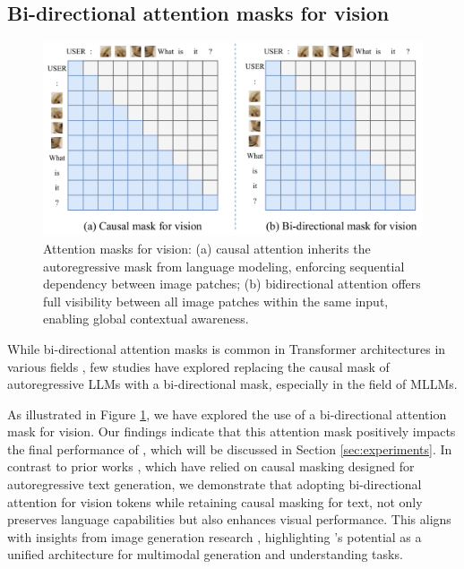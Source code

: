 \subsection{Bi-directional attention masks for vision}

\begin{figure}
    \centering
    \includegraphics[width=\linewidth]{images/Figure3.pdf}
    \caption{Attention masks for vision: (a) causal attention inherits the autoregressive mask from language modeling, enforcing sequential dependency between image patches; (b) bidirectional attention offers full visibility between all image patches within the same input, enabling global contextual awareness.}
    \label{fig:attention-mask}
\end{figure}

While bi-directional attention masks is common in Transformer architectures in various fields \cite{vit, clip, transfusion}, few studies have explored replacing the causal mask of autoregressive LLMs with a bi-directional mask, especially in the field of MLLMs.

As illustrated in Figure \ref{fig:attention-mask}, we have explored the use of a bi-directional attention mask for vision. Our findings indicate that this attention mask positively impacts the final performance of \model{}, which will be discussed in Section \ref{sec:experiments}. In contrast to prior works \cite{eve, evev2, monointernvl, fuyu}, which have relied on causal masking designed for autoregressive text generation, we demonstrate that adopting bi-directional attention for vision tokens while retaining causal masking for text, not only preserves language capabilities but also enhances visual performance. This aligns with insights from image generation research \cite{transfusion}, highlighting \model{}’s potential as a unified architecture for multimodal generation and understanding tasks.



